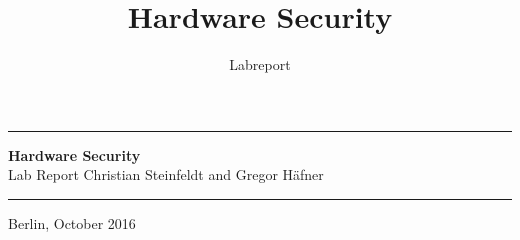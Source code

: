 \documentclass[a4paper, 12pt]{scrartcl}
\title{Hardware Security}
\subtitle{Labreport}
\date{}
\begin{document}
    \begin{titlepage}
        \begin{figure*}
            \begin{flushright}
            \end{flushright}
        \end{figure*}
        \vspace*{-1cm}
        \hrule
        \vspace{.2cm}
        \begin{center}
            \vfill
            \textsf{\textbf{\Huge{Hardware Security}}}\\[1.5em]
            \textsf{\LARGE{Lab Report}}
            \vfill
            Christian Steinfeldt and Gregor Häfner
        \end{center}
        \vfill
        \hrule
        \vspace{.2cm}
        \large{Berlin, October 2016}
    \end{titlepage}
    
    \setcounter{page}{1}
    
    \clearpage
    
    
    \clearpage
    
    
    \clearpage
    
    
    \clearpage
    
    
    \clearpage
    
    
\end{document}
